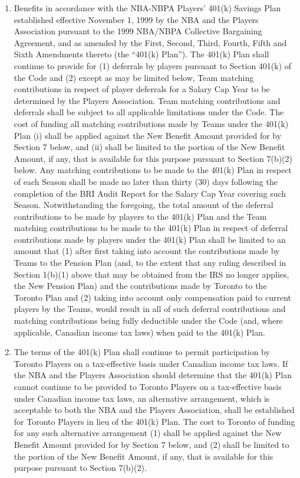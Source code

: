 \documentclass[
]{book}
\providecommand{\tightlist}{%
  \setlength{\itemsep}{0pt}\setlength{\parskip}{0pt}}
\begin{document}
\begin{enumerate}
\def\labelenumi{(\alph{enumi})}
\tightlist
\item
  Benefits in accordance with the NBA-NBPA Players' 401(k) Savings Plan established effective November 1, 1999 by the NBA and the Players Association pursuant to the 1999 NBA/NBPA Collective Bargaining Agreement, and as amended by the First, Second, Third, Fourth, Fifth and Sixth Amendments thereto (the ``401(k) Plan''). The 401(k) Plan shall continue to provide for (1) deferrals by players pursuant to Section 401(k) of the Code and (2) except as may be limited below, Team matching contributions in respect of player deferrals for a Salary Cap Year to be determined by the Players Association. Team matching contributions and deferrals shall be subject to all applicable limitations under the Code. The cost of funding all matching contributions made by Teams under the 401(k) Plan (i) shall be applied against the New Benefit Amount provided for by Section 7 below, and (ii) shall be limited to the portion of the New Benefit Amount, if any, that is available for this purpose pursuant to Section 7(b)(2) below. Any matching contributions to be made to the 401(k) Plan in respect of each Season shall be made no later than thirty (30) days following the completion of the BRI Audit Report for the Salary Cap Year covering such Season.
  Notwithstanding the foregoing, the total amount of the deferral contributions to be made by players to the 401(k) Plan and the Team matching contributions to be made to the 401(k) Plan in respect of deferral contributions made by players under the 401(k) Plan shall be limited to an amount that (1) after first taking into account the contributions made by Teams to the Pension Plan (and, to the extent that any ruling described in Section 1(b)(1) above that may be obtained from the IRS no longer applies, the New Pension Plan) and the contributions made by Toronto to the Toronto Plan and (2) taking into account only compensation paid to current players by the Teams, would result in all of such deferral contributions and matching contributions being fully deductible under the Code (and, where applicable, Canadian income tax laws) when paid to the 401(k) Plan.
\item
  The terms of the 401(k) Plan shall continue to permit participation by Toronto Players on a tax-effective basis under Canadian income tax laws. If the NBA and the Players Association should determine that the 401(k) Plan cannot continue to be provided to Toronto Players on a tax-effective basis under Canadian income tax laws, an alternative arrangement, which is acceptable to both the NBA and the Players Association, shall be established for Toronto Players in lieu of the 401(k) Plan. The cost to Toronto of funding for any such alternative arrangement (1) shall be applied against the New Benefit Amount provided for by Section 7 below, and (2) shall be limited to the portion of the New Benefit Amount, if any, that is available for this purpose pursuant to Section 7(b)(2).

\end{enumerate}
\end{document}
